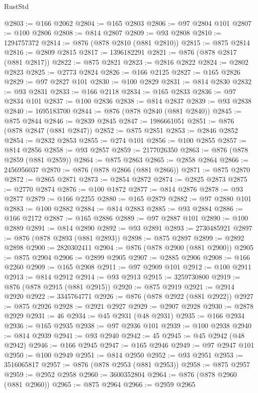 \begin{lexlean}{RustStd}
\begin{coremodule}
@2803 := @166 @2062
@2804 := @165 @2803
@2806 := @97 @2804 @101
@2807 := @100 @2806
@2808 := @814 @2807
@2809 := @93 @2808
@2810 := 1294757372
@2814 := @876 (@878 @2810 (@881 @2810))
@2815 := @875 @2814
@2816 := @2809 @2815
@2817 := 1396182291
@2821 := @876 (@878 @2817 (@881 @2817))
@2822 := @875 @2821
@2823 := @2816 @2822
@2824 := @2802 @2823
@2825 := @2773 @2824
@2826 := @166 @2125
@2827 := @165 @2826
@2829 := @97 @2827 @101
@2830 := @100 @2829
@2831 := @814 @2830
@2832 := @93 @2831
@2833 := @166 @2118
@2834 := @165 @2833
@2836 := @97 @2834 @101
@2837 := @100 @2836
@2838 := @814 @2837
@2839 := @93 @2838
@2840 := 1695183700
@2844 := @876 (@878 @2840 (@881 @2840))
@2845 := @875 @2844
@2846 := @2839 @2845
@2847 := 1986661051
@2851 := @876 (@878 @2847 (@881 @2847))
@2852 := @875 @2851
@2853 := @2846 @2852
@2854 := @2832 @2853
@2855 := @274 @101
@2856 := @100 @2855
@2857 := @814 @2856
@2858 := @93 @2857
@2859 := 2177026350
@2863 := @876 (@878 @2859 (@881 @2859))
@2864 := @875 @2863
@2865 := @2858 @2864
@2866 := 2456956037
@2870 := @876 (@878 @2866 (@881 @2866))
@2871 := @875 @2870
@2872 := @2865 @2871
@2873 := @2854 @2872
@2874 := @2825 @2873
@2875 := @2770 @2874
@2876 := @100 @1872
@2877 := @814 @2876
@2878 := @93 @2877
@2879 := @166 @2255
@2880 := @165 @2879
@2882 := @97 @2880 @101
@2883 := @100 @2882
@2884 := @814 @2883
@2885 := @93 @2884
@2886 := @166 @2172
@2887 := @165 @2886
@2889 := @97 @2887 @101
@2890 := @100 @2889
@2891 := @814 @2890
@2892 := @93 @2891
@2893 := 2730485921
@2897 := @876 (@878 @2893 (@881 @2893))
@2898 := @875 @2897
@2899 := @2892 @2898
@2900 := 2820302411
@2904 := @876 (@878 @2900 (@881 @2900))
@2905 := @875 @2904
@2906 := @2899 @2905
@2907 := @2885 @2906
@2908 := @166 @2260
@2909 := @165 @2908
@2911 := @97 @2909 @101
@2912 := @100 @2911
@2913 := @814 @2912
@2914 := @93 @2913
@2915 := 3259730800
@2919 := @876 (@878 @2915 (@881 @2915))
@2920 := @875 @2919
@2921 := @2914 @2920
@2922 := 3345764771
@2926 := @876 (@878 @2922 (@881 @2922))
@2927 := @875 @2926
@2928 := @2921 @2927
@2929 := @2907 @2928
@2930 := @2878 @2929
@2931 := 46
@2934 := @45 @2931 (@48 @2931)
@2935 := @166 @2934
@2936 := @165 @2935
@2938 := @97 @2936 @101
@2939 := @100 @2938
@2940 := @814 @2939
@2941 := @93 @2940
@2942 := 45
@2945 := @45 @2942 (@48 @2942)
@2946 := @166 @2945
@2947 := @165 @2946
@2949 := @97 @2947 @101
@2950 := @100 @2949
@2951 := @814 @2950
@2952 := @93 @2951
@2953 := 3516065817
@2957 := @876 (@878 @2953 (@881 @2953))
@2958 := @875 @2957
@2959 := @2952 @2958
@2960 := 3600352804
@2964 := @876 (@878 @2960 (@881 @2960))
@2965 := @875 @2964
@2966 := @2959 @2965

\end{coremodule}
\end{lexlean}
